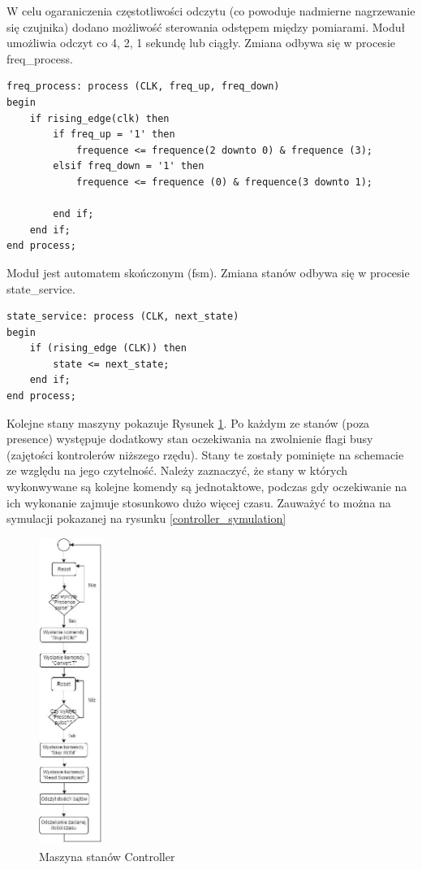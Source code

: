 \documentclass[a4paper]{article}
\begin{document}
W celu ogaraniczenia częstotliwości odczytu (co powoduje nadmierne nagrzewanie się czujnika) dodano możliwość sterowania odstępem między pomiarami. Moduł umożliwia odczyt co 4, 2, 1 sekundę lub ciągły. Zmiana odbywa się w procesie freq\_process.

\lstset{language=VHDL}
\begin{lstlisting}[frame=single]
freq_process: process (CLK, freq_up, freq_down)
begin
	if rising_edge(clk) then
		if freq_up = '1' then
			frequence <= frequence(2 downto 0) & frequence (3);
		elsif freq_down = '1' then
			frequence <= frequence (0) & frequence(3 downto 1);

		end if;
	end if;
end process;
\end{lstlisting}

Moduł jest automatem skończonym (fsm). Zmiana stanów odbywa się w procesie  state\_service.

\lstset{language=VHDL}
\begin{lstlisting}[frame=single]
state_service: process (CLK, next_state)
begin
	if (rising_edge (CLK)) then
		state <= next_state;
	end if;
end process;
\end{lstlisting}

Kolejne stany maszyny pokazuje Rysunek \ref{controller_fsm}. Po każdym ze stanów (poza presence) występuje dodatkowy stan oczekiwania na zwolnienie flagi busy (zajętości kontrolerów niższego rzędu). Stany te zostały pominięte na schemacie ze względu na jego czytelność. Należy zaznaczyć, że stany w których wykonwywane są kolejne komendy są jednotaktowe, podczas gdy oczekiwanie na ich wykonanie zajmuje stosunkowo dużo więcej czasu. Zauważyć to można na symulacji pokazanej na rysunku \ref{controller_symulation}

\begin{figure}[H]
\begin{center}
\includegraphics[height=10cm]{graphics/controller_fsm.png}
\end{center}
\caption{Maszyna stanów Controller}
\label{controller_fsm}
\end{figure}
\end{document}
